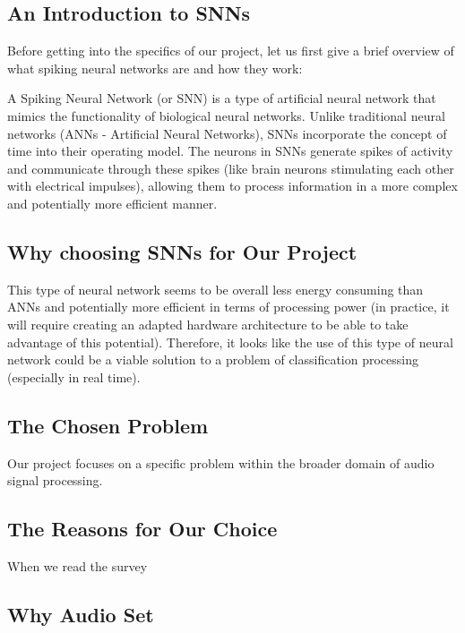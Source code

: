 \documentclass{article}
\begin{document}
\subsection{An Introduction to SNNs}

Before getting into the specifics of our project, let us first give a brief overview of what spiking neural networks are and how they work:

A Spiking Neural Network (or SNN) is a type of artificial neural network that mimics the functionality of biological neural networks. Unlike traditional neural networks (ANNs - Artificial Neural Networks), SNNs incorporate the concept of time into their operating model. The neurons in SNNs generate spikes of activity and communicate through these spikes (like brain neurons stimulating each other with electrical impulses), allowing them to process information in a more complex and potentially more efficient manner.


\subsection{Why choosing SNNs for Our Project}

This type of neural network seems to be overall less energy consuming than ANNs and potentially more efficient in terms of processing power (in practice, it will require creating an adapted hardware architecture to be able to take advantage of this potential). Therefore, it looks like the use of this type of neural network could be a viable solution to a problem of classification processing (especially in real time).

\subsection{The Chosen Problem}

Our project focuses on a specific problem within the broader domain of audio signal processing.

\subsection{The Reasons for Our Choice}

When we read the survey \cite[about SNNs]{snn_survey}


\subsection{Why Audio Set}
\end{document}
